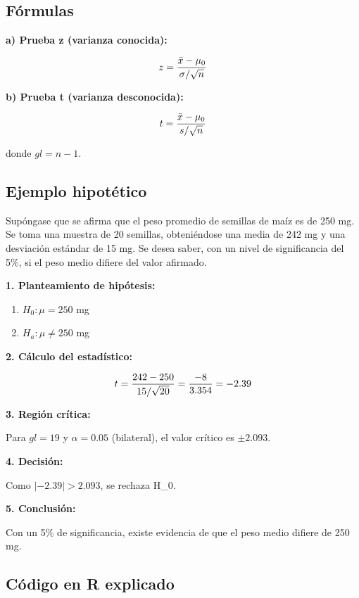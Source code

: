 \documentclass[
  spanish,
  letterpaper,
]{book}
\begin{document}
\subsection{Fórmulas}\label{fuxf3rmulas}

\textbf{a) Prueba z (varianza conocida):}

\[\huge z = \frac{\bar{x} - \mu_0}{\sigma / \sqrt{n}}  \]\hspace{0pt}\hspace{0pt}

\textbf{b) Prueba t (varianza desconocida):}

\[\huge t = \frac{\bar{x} - \mu_0}{s / \sqrt{n}} \]

donde \(gl = n-1\).

\subsection{Ejemplo hipotético}\label{ejemplo-hipotuxe9tico}

Supóngase que se afirma que el peso promedio de semillas de maíz es de
250 mg. Se toma una muestra de 20 semillas, obteniéndose una media de
242 mg y una desviación estándar de 15 mg. Se desea saber, con un nivel
de significancia del 5\%, si el peso medio difiere del valor afirmado.

\textbf{1. Planteamiento de hipótesis:}

\begin{enumerate}
\def\labelenumi{\arabic{enumi}.}
\item
  \(H_0: \mu = 250\) mg
\item
  \(H_a: \mu \neq 250\) mg
\end{enumerate}

\textbf{2. Cálculo del estadístico:}

\[\Large t = \frac{242 - 250}{15 / \sqrt{20}} = \frac{-8}{3.354} = -2.39 \]

\textbf{3. Región crítica:}

Para \(gl=19\) y \(\alpha = 0.05\) (bilateral), el valor crítico es
\(\pm 2.093\).

\textbf{4. Decisión:}

Como \(|-2.39| > 2.093\), se rechaza H\_0.

\textbf{5. Conclusión:}

Con un 5\% de significancia, existe evidencia de que el peso medio
difiere de 250 mg.

\subsection{Código en R explicado}\label{cuxf3digo-en-r-explicado}
\end{document}
